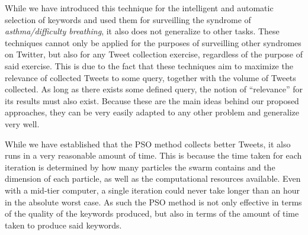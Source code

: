 \documentclass[runningheads]{llncs}
\begin{document}
While we have introduced this technique for the intelligent and automatic selection of keywords and used them for surveilling the syndrome of \textit{asthma/difficulty breathing}, it also does not generalize to other tasks. These techniques cannot only be applied for the purposes of surveilling other syndromes on Twitter, but also for any Tweet collection exercise, regardless of the purpose of said exercise. This is due to the fact that these techniques aim to maximize the relevance of collected Tweets to some query, together with the volume of Tweets collected. As long as there exists some defined query, the notion of ``relevance'' for its results must also exist. Because these are the main ideas behind our proposed approaches, they can be very easily adapted to any other problem and generalize very well.

While we have established that the PSO method collects better Tweets, it also runs in a very reasonable amount of time. This is because the time taken for each iteration is determined by how many particles the swarm contains and the dimension of each particle, as well as the computational resources available. Even with a mid-tier computer, a single iteration could never take longer than an hour in the absolute worst case. As such the PSO method is not only effective in terms of the quality of the keywords produced, but also in terms of the amount of time taken to produce said keywords.
%
%
%


\end{document}
